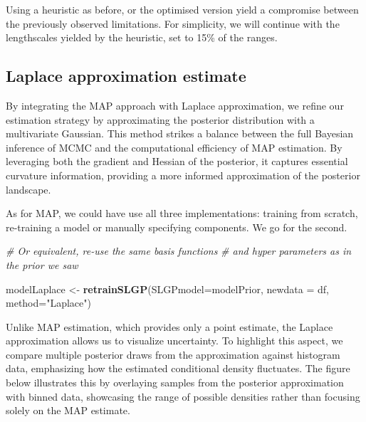 \documentclass[
]{article}
\newenvironment{Shaded}{\begin{snugshade}}{\end{snugshade}}
\newcommand{\AttributeTok}[1]{\textcolor[rgb]{0.13,0.29,0.53}{#1}}
\newcommand{\CommentTok}[1]{\textcolor[rgb]{0.56,0.35,0.01}{\textit{#1}}}
\newcommand{\FunctionTok}[1]{\textcolor[rgb]{0.13,0.29,0.53}{\textbf{#1}}}
\newcommand{\NormalTok}[1]{#1}
\newcommand{\OtherTok}[1]{\textcolor[rgb]{0.56,0.35,0.01}{#1}}
\newcommand{\StringTok}[1]{\textcolor[rgb]{0.31,0.60,0.02}{#1}}
\begin{document}
Using a heuristic as before, or the optimised version yield a compromise between the previously observed limitations.
For simplicity, we will continue with the lengthscales yielded by the heuristic, set to 15\% of the ranges.

\subsection{Laplace approximation estimate}\label{laplace-approximation-estimate}

By integrating the MAP approach with Laplace approximation, we refine our estimation strategy by approximating the posterior distribution with a multivariate Gaussian. This method strikes a balance between the full Bayesian inference of MCMC and the computational efficiency of MAP estimation. By leveraging both the gradient and Hessian of the posterior, it captures essential curvature information, providing a more informed approximation of the posterior landscape.

As for MAP, we could have use all three implementations: training from scratch, re-training a model or manually specifying components. We go for the second.

\begin{Shaded}
\begin{Highlighting}[]
\CommentTok{\# Or equivalent, re{-}use the same basis functions }
\CommentTok{\# and hyper parameters as in the prior we saw}

\NormalTok{modelLaplace }\OtherTok{\textless{}{-}} \FunctionTok{retrainSLGP}\NormalTok{(}\AttributeTok{SLGPmodel=}\NormalTok{modelPrior, }
                            \AttributeTok{newdata =}\NormalTok{ df, }
                            \AttributeTok{method=}\StringTok{"Laplace"}\NormalTok{)}
\end{Highlighting}
\end{Shaded}

Unlike MAP estimation, which provides only a point estimate, the Laplace approximation allows us to visualize uncertainty. To highlight this aspect, we compare multiple posterior draws from the approximation against histogram data, emphasizing how the estimated conditional density fluctuates. The figure below illustrates this by overlaying samples from the posterior approximation with binned data, showcasing the range of possible densities rather than focusing solely on the MAP estimate.
\end{document}
